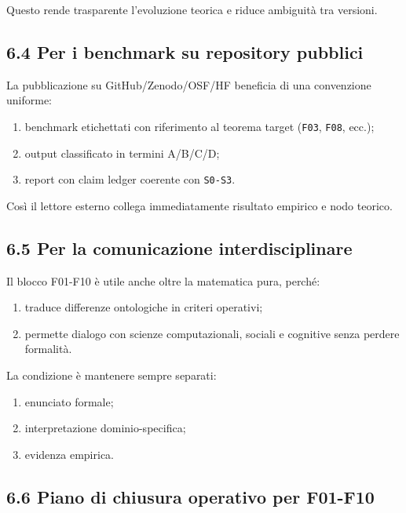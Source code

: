 Questo rende trasparente l'evoluzione teorica e riduce ambiguità tra versioni.

\subsection{6.4 Per i benchmark su repository pubblici}

La pubblicazione su GitHub/Zenodo/OSF/HF beneficia di una convenzione uniforme:

\begin{enumerate}
\def\labelenumi{\arabic{enumi}.}
\tightlist
\item
  benchmark etichettati con riferimento al teorema target (\texttt{F03}, \texttt{F08}, ecc.);
\item
  output classificato in termini A/B/C/D;
\item
  report con claim ledger coerente con \texttt{S0-S3}.
\end{enumerate}

Così il lettore esterno collega immediatamente risultato empirico e nodo teorico.

\subsection{6.5 Per la comunicazione interdisciplinare}

Il blocco F01-F10 è utile anche oltre la matematica pura, perché:

\begin{enumerate}
\def\labelenumi{\arabic{enumi}.}
\tightlist
\item
  traduce differenze ontologiche in criteri operativi;
\item
  permette dialogo con scienze computazionali, sociali e cognitive senza perdere formalità.
\end{enumerate}

La condizione è mantenere sempre separati:

\begin{enumerate}
\def\labelenumi{\arabic{enumi}.}
\tightlist
\item
  enunciato formale;
\item
  interpretazione dominio-specifica;
\item
  evidenza empirica.
\end{enumerate}

\subsection{6.6 Piano di chiusura operativo per F01-F10}

